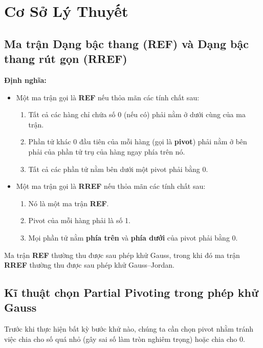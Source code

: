 \documentclass[a4paper,12pt]{report}
\begin{document}
\section{Cơ Sở Lý Thuyết}

\subsection{Ma trận Dạng bậc thang (REF) và Dạng bậc thang rút gọn (RREF)}

\textbf{Định nghĩa:}

\begin{itemize}
    \item Một ma trận gọi là \textbf{REF} nếu thỏa mãn các tính chất sau:
    \begin{enumerate}
        \item Tất cả các hàng chỉ chứa số 0 (nếu có) phải nằm ở dưới cùng của ma trận.
        \item Phần tử khác 0 đầu tiên của mỗi hàng (gọi là \textbf{pivot}) phải nằm ở bên phải của phần tử trụ của hàng ngay phía trên nó.
        \item Tất cả các phần tử nằm bên dưới một pivot phải bằng 0.
    \end{enumerate}

    \item Một ma trận gọi là \textbf{RREF} nếu thỏa mãn các tính chất sau:
    \begin{enumerate}
        \item Nó là một ma trận \textbf{REF}.
        \item Pivot của mỗi hàng phải là số 1.
        \item Mọi phần tử nằm \textbf{phía trên} và \textbf{phía dưới} của pivot phải bằng 0.
    \end{enumerate}
\end{itemize}

Ma trận \textbf{REF} thường thu được sau phép khử Gauss, trong khi đó ma trận \textbf{RREF} thường thu được sau phép khử Gauss--Jordan.

\vspace*{0.2cm}
\subsection{Kĩ thuật chọn Partial Pivoting trong phép khử Gauss}
Trước khi thực hiện bất kỳ bước khử nào, chúng ta cần chọn pivot nhằm tránh việc chia cho số quá nhỏ (gây sai số làm tròn nghiêm trọng) hoặc chia cho 0.
\end{document}
